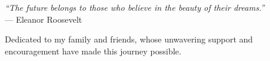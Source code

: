 \thispagestyle{empty}

\vspace*{3cm}

\begin{flushright}
    \textit{“The future belongs to those who believe in the beauty of their dreams.”} \\ \medskip
    --- Eleanor Roosevelt
\end{flushright}

\medskip

\begin{flushright}
    Dedicated to my family and friends, whose unwavering support and encouragement have made this journey possible.
\end{flushright}